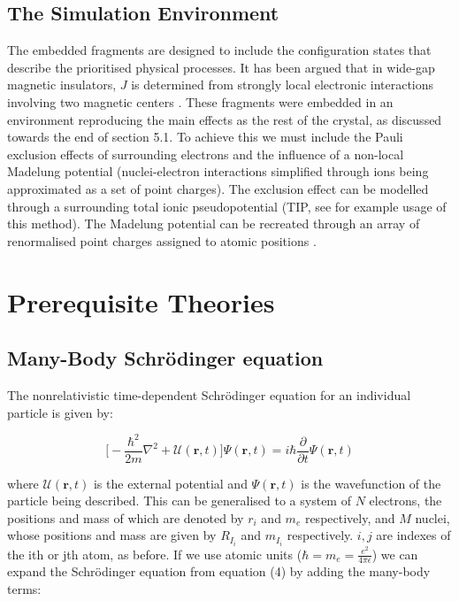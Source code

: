 \documentclass[10pt]{article}
\begin{document}
\subsection{The Simulation Environment}
The embedded fragments are designed to include the configuration states that describe the prioritised physical processes. It has been argued that in wide-gap magnetic insulators, $J$ is determined from strongly local electronic interactions involving two magnetic centers \cite{de1999local}. These fragments were embedded in an environment reproducing the main effects as the rest of the crystal, as discussed towards the end of section 5.1. To achieve this we must include the Pauli exclusion effects of surrounding electrons and the influence of a non-local Madelung potential (nuclei-electron interactions simplified through ions being approximated as a set of point charges). The exclusion effect can be modelled through a surrounding total ionic pseudopotential (TIP, see \cite{winter1987theoretical} for example usage of this method). The Madelung potential can be recreated through an array of renormalised point charges assigned to atomic positions \cite{gelle2008fast}.

\section{Prerequisite Theories}
\subsection{Many-Body Schrödinger equation}
The nonrelativistic time-dependent Schrödinger equation for an individual particle is given by:

\begin{equation}
	\biggr[-\frac{\hbar^2}{2m}\nabla^2+\mathcal{U}(\textbf{r},t)\biggr]\Psi(\textbf{r},t) = i\hbar\frac{\partial}{\partial t}\Psi(\textbf{r},t)
\end{equation}

where $\mathcal{U}(\textbf{r},t)$ is the external potential and $\Psi(\textbf{r},t)$ is the wavefunction of the particle being described. This can be generalised to a system of $N$ electrons, the positions and mass of which are denoted by \textbf{$r_i$} and $m_e$ respectively, and $M$ nuclei, whose positions and mass are given by \textbf{$R_{I_i}$} and $m_{I_i}$ respectively. $i,j$ are indexes of the ith or jth atom, as before. If we use atomic units ($\hbar = m_e = \frac{e^2}{4\pi\epsilon}$) we can expand the Schrödinger equation from equation (4) by adding the many-body terms:
\end{document}
